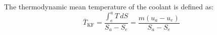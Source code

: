 The thermodynamic mean temperature of the coolant is defined as:  
\[
\bar{T}_{\text{KF}} = \frac{\int_e^a T \, dS}{S_a - S_e} = \frac{m (u_a - u_e)}{S_a - S_e}
\]